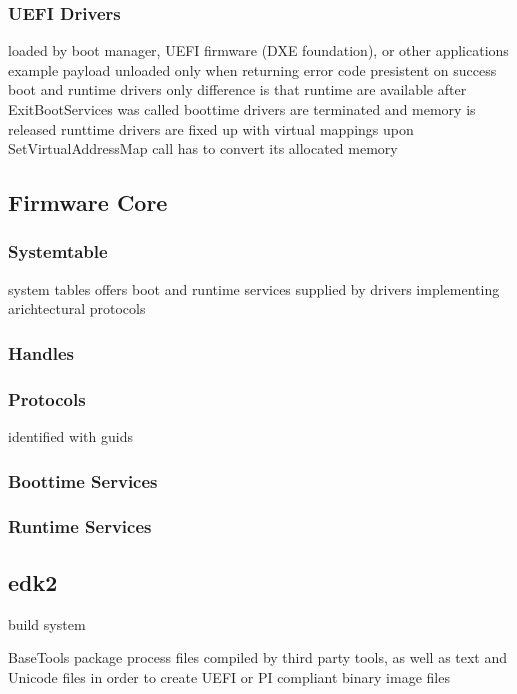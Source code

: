 \subsubsection{UEFI Drivers}

loaded by boot manager, UEFI firmware (DXE foundation), or other applications
example payload
unloaded only when returning error code
presistent on success
boot and runtime drivers
only difference is that runtime are available after ExitBootServices was called
boottime drivers are terminated and memory is released
runttime drivers are fixed up with virtual mappings upon SetVirtualAddressMap call
has to convert its allocated memory

\subsection{Firmware Core}
\subsubsection{Systemtable}
system tables offers boot and runtime services
supplied by drivers implementing arichtectural protocols %
\subsubsection{Handles}
\subsubsection{Protocols}
identified with guids
\subsubsection{Boottime Services}
\subsubsection{Runtime Services}


\subsection{edk2}
build system

BaseTools package process files compiled by third party tools, as well as text and Unicode files in order to create UEFI or PI compliant binary image files
\cite{tianocore-edk2}